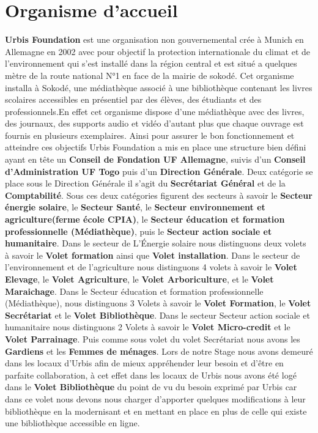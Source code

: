 \documentclass[14pt,a4paper]{article}
\begin{document}
\section{Organisme d'accueil}
\textbf{Urbis Foundation} est une organisation non gouvernemental crée à Munich en Allemagne en 2002 avec pour objectif la protection internationale du climat et de l’environnement qui s'est installé dans la région central et est situé a quelques mètre de la route national N°1 en face de la mairie de sokodé. Cet organisme installa à Sokodé, une médiathèque associé à une bibliothèque contenant les livres scolaires accessibles en présentiel par des élèves, des étudiants et des professionnels.En effet cet organisme dispose d'une médiathèque avec des livres, des journaux, des supports audio et vidéo d'autant plus que chaque ouvrage est fournis en plusieurs exemplaires. Ainsi pour assurer le bon fonctionnement et atteindre ces objectifs Urbis Foundation a mis en place une structure bien défini ayant en tête un \textbf{Conseil de Fondation UF Allemagne}, suivis d'un \textbf{Conseil d’Administration UF Togo} puis d'un \textbf{Direction Générale}. Deux catégorie se place sous le Direction Générale il s'agit du \textbf{Secrétariat Général} et de la \textbf{Comptabilité}. Sous ces deux catégories figurent des secteurs à savoir le \textbf{Secteur énergie solaire}, le \textbf{Secteur Santé}, le \textbf{Secteur environnement et agriculture(ferme école CPIA)}, le \textbf{Secteur éducation et formation professionnelle (Médiathèque)}, puis le \textbf{Secteur action sociale et humanitaire}. Dans le secteur de L’Énergie solaire nous distinguons deux volets à savoir le \textbf{Volet formation} ainsi que \textbf{Volet installation}. Dans le secteur de l'environnement et de l'agriculture nous distinguons 4 volets à savoir le \textbf{Volet Elevage}, le \textbf{Volet Agriculture}, le \textbf{Volet Arboriculture}, et le \textbf{Volet Maraichage}. Dans le Secteur éducation et formation professionnelle (Médiathèque), nous distinguons 3 Volets à savoir le \textbf{Volet Formation}, le \textbf{Volet Secrétariat} et le \textbf{Volet Bibliothèque}. Dans le secteur Secteur action sociale et humanitaire nous distinguons 2 Volets à savoir le \textbf{Volet Micro-credit} et le \textbf{Volet Parrainage}. Puis comme sous volet du volet Secrétariat nous avons les \textbf{Gardiens} et les \textbf{Femmes de ménages}. Lors de notre Stage nous avons demeuré dans les locaux d'Urbis afin de mieux appréhender leur besoin et d'être en parfaite collaboration, à cet effet dans les locaux de Urbis nous avons été logé dans le \textbf{Volet Bibliothèque} du point de vu du besoin exprimé par Urbis car dans ce volet nous devons nous charger d'apporter quelques modifications à leur bibliothèque en la modernisant et en mettant en place en plus de celle qui existe une bibliothèque accessible en ligne.\\
\end{document}
